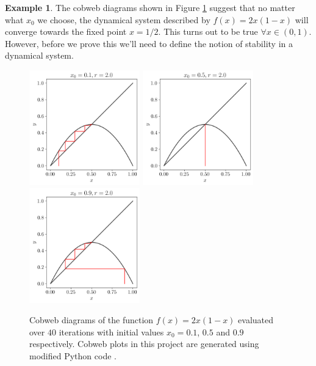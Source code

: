 \documentclass[11pt,a4paper,oneside]{memoir}
\theoremstyle{plain}
\theoremstyle{definition}
\newtheorem{exmp}[thm]{Example}
\begin{document}
\begin{exmp} The cobweb diagrams shown in Figure \ref{fig:cobweb_logistic} suggest that no matter what $x_0$ we choose, the dynamical system described by $f(x) = 2x(1-x)$ will converge towards the fixed point $x = 1/2$. This turns out to be true $\forall x \in (0, 1)$. However, before we prove this we'll need to define the notion of stability in a dynamical system.

    \begin{figure}[h]
        \centering
        \includegraphics[width=4.8cm]{cobweb_0.1_2.0}
        \includegraphics[width=4.8cm]{cobweb_0.5_2.0}
        \includegraphics[width=4.8cm]{cobweb_0.9_2.0}
        \caption{Cobweb diagrams of the function $f(x) = 2x(1-x)$ evaluated over $40$ iterations with initial values $x_0 = 0.1$, $0.5$ and $0.9$ respectively. Cobweb plots in this project are generated using modified Python code \cite{cobweb}.}
        \label{fig:cobweb_logistic}
    \end{figure}
    
\end{exmp}
\end{document}
